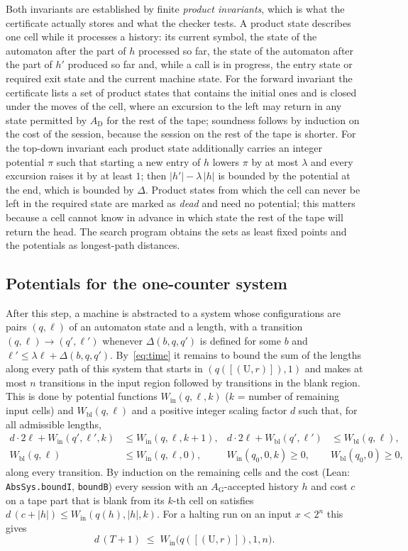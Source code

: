 \documentclass[11pt,a4paper]{amsart}
\theoremstyle{definition}
\theoremstyle{remark}
\newcommand{\U}{\mathrm{U}}
\newcommand{\lean}[1]{\texttt{#1}}
\newcommand{\len}[1]{\lvert #1\rvert}
\begin{document}
Both invariants are established by finite \emph{product invariants}, which is what the certificate actually
stores and what the checker tests. A product state describes one cell while it processes a history: its
current symbol, the state of the automaton after the part of $h$ processed so far, the state of the automaton
after the part of $h'$ produced so far and, while a call is in progress, the entry state or required exit
state and the current machine state. For the forward invariant the certificate lists a set of product states
that contains the initial ones and is closed under the moves of the cell, where an excursion to the left may
return in any state permitted by $A_{\mathrm D}$ for the rest of the tape; soundness follows by induction on
the cost of the session, because the session on the rest of the tape is shorter. For the top-down invariant
each product state additionally carries an integer potential $\pi$ such that starting a new entry of $h$
lowers $\pi$ by at most $\lambda$ and every excursion raises it by at least $1$; then $\len{h'}-\lambda\,\len{h}$ is
bounded by the potential at the end, which is bounded by $\Delta$. Product states from which the cell can
never be left in the required state are marked as \emph{dead} and need no potential; this matters because a
cell cannot know in advance in which state the rest of the tape will return the head. The search program
obtains the sets as least fixed points and the potentials as longest-path distances.

\subsection{Potentials for the one-counter system}
After this step, a machine is abstracted to a system whose configurations are pairs $(q,\ell)$ of an automaton
state and a length, with a transition $(q,\ell)\to(q',\ell')$ whenever $\Delta(b,q,q')$ is defined for some
$b$ and $\ell'\le \lambda\ell+\Delta(b,q,q')$. By~\eqref{eq:time} it remains to bound the sum of the lengths along
every path of this system that starts in $(q([(\U,r)]),1)$ and makes at most $n$ transitions in the input
region followed by transitions in the blank region. This is done by potential functions
$W_{\mathrm{in}}(q,\ell,k)$ ($k$ = number of remaining input cells) and $W_{\mathrm{bl}}(q,\ell)$ and a
positive integer scaling factor $d$ such that, for all admissible lengths,
\begin{align*}
d\cdot 2\ell+W_{\mathrm{in}}(q',\ell',k)&\le W_{\mathrm{in}}(q,\ell,k+1), &
d\cdot 2\ell+W_{\mathrm{bl}}(q',\ell')&\le W_{\mathrm{bl}}(q,\ell),\\
W_{\mathrm{bl}}(q,\ell)&\le W_{\mathrm{in}}(q,\ell,0), &
W_{\mathrm{in}}(q_0,0,k)\ge0,\ \ &W_{\mathrm{bl}}(q_0,0)\ge0,
\end{align*}
along every transition. By induction on the remaining cells and the cost (Lean: \lean{AbsSys.boundI},
\lean{boundB}) every session with an $A_{\mathrm G}$-accepted history $h$ and cost $c$ on a tape part that is
blank from its $k$-th cell on satisfies $d\,(c+\len{h})\le W_{\mathrm{in}}(q(h),\len{h},k)$. For a halting run on
an input $x<2^n$ this gives
\[ d\,(T+1)\;\le\; W_{\mathrm{in}}\bigl(q([(\U,r)]),1,n\bigr). \]
\end{document}
